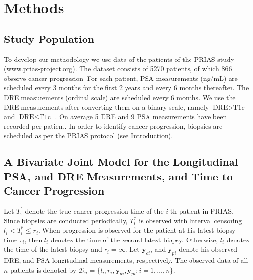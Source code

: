 
\section{Methods}
\label{sec:methods}
\subsection{Study Population}
To develop our methodology we use data of the patients of the PRIAS study (\url{www.prias-project.org}). The dataset consists of 5270 patients, of which 866 observe cancer progression. For each patient, PSA measurements (ng/mL) are scheduled every 3 months for the first 2 years and every 6 months thereafter. The DRE measurements (ordinal scale) are scheduled every 6 months. We use the DRE measurements after converting them on a binary scale, namely $\mbox{DRE} > \mbox{T1c}$ and $\mbox{DRE} \leq \mbox{T1c}$ \cite{schroder1992tnm}. On average 5 DRE and 9 PSA measurements have been recorded per patient. In order to identify cancer progression, biopsies are scheduled as per the PRIAS protocol (see \hyperref[sec:introduction]{Introduction}).

\subsection{A Bivariate Joint Model for the Longitudinal PSA, and DRE Measurements, and Time to Cancer Progression}
Let $T_i^*$ denote the true cancer progression time of the $i$-th patient in PRIAS. Since biopsies are conducted periodically, $T_i^*$ is observed with interval censoring ${l_i < T_i^* \leq r_i}$. When progression is observed for the patient at his latest biopsy time $r_i$, then $l_i$ denotes the time of the second latest biopsy. Otherwise, $l_i$ denotes the time of the latest biopsy and $r_i = \infty$. Let $\boldsymbol{y}_{di}$, and $\boldsymbol{y}_{pi}$ denote his observed DRE, and PSA longitudinal measurements, respectively. The observed data of all $n$ patients is denoted by ${\mathcal{D}_n = \{l_i, r_i, \boldsymbol{y}_{di}, \boldsymbol{y}_{pi}; i = 1, \ldots, n\}}$.

